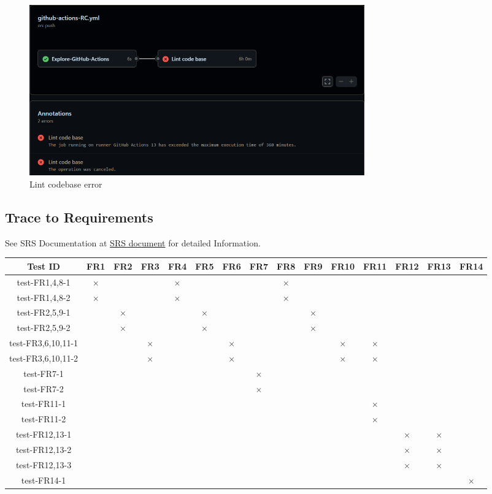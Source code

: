 \documentclass[12pt, titlepage]{article}
\begin{document}
\begin{figure}[h]
  \centering
  \includegraphics[width=0.7\textwidth]{lintCodebaseError.png}
  \caption{Lint codebase error}
  \label{FigUH}
\end{figure}

\newpage

\begin{landscape}
\section{Trace to Requirements}

See SRS Documentation at \href{https://github.com/Inreet-Kaur/capstone/blob/main/docs/SRS/SRS.pdf} {SRS document} for detailed Information.\\

\begin{table}[H]
  \centering
  \begin{tabular}{|c|c|c|c|c|c|c|c|c|c|c|c|c|c|c|}
  \hline
   Test ID & FR1 & FR2 & FR3 & FR4 & FR5 & FR6 & FR7 & FR8 & FR9 & FR10 & FR11 & FR12 & FR13 & FR14 \\
  \hline
  test-FR1,4,8-1 & $\times$ & & & $\times$ & & & & $\times$ & & & & & &\\
  \hline
  test-FR1,4,8-2 & $\times$ & & & $\times$ & & & & $\times$ & & & & & &\\
  \hline
  test-FR2,5,9-1 & & $\times$ & & & $\times$ & & & & $\times$ & & & & & \\
  \hline
  test-FR2,5,9-2 & & $\times$ & & & $\times$ & & & & $\times$ & & & & \\
  \hline
  test-FR3,6,10,11-1 & & & $\times$ & & & $\times$ & & & & $\times$ & $\times$ & & &\\
  \hline
  test-FR3,6,10,11-2 & & & $\times$ & & & $\times$ & & & & $\times$ & $\times$ & & &\\
  \hline
  test-FR7-1 & & & & & & & $\times$ & & & & & & &\\
  \hline
  test-FR7-2 & & & & & & & $\times$ & & & & & & &\\
  \hline
  test-FR11-1 & & & & & & & & & & & $\times$ & & &\\
  \hline
  test-FR11-2 & & & & & & & & & & & $\times$ & & &\\
  \hline
  test-FR12,13-1 & & & & & & & & & & & & $\times$ & $\times$ &\\
  \hline
  test-FR12,13-2 & & & & & & & & & & & & $\times$ & $\times$ &\\
  \hline
  test-FR12,13-3 & & & & & & & & & & & & $\times$ & $\times$ &\\
  \hline
  test-FR14-1 & & & & & & & & & & & & & &$\times$ \\
  \hline


\end{tabular}
\end{table}
\end{landscape}
\end{document}
